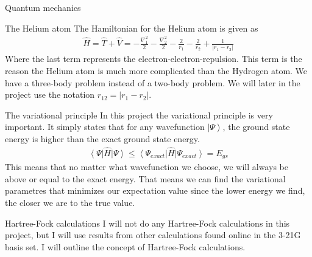 \documentclass[a4paper, 12pt, titlepage]{article}
\begin{document}
\begin{section}{Quantum mechanics}
 \begin{subsection}{The Helium atom}
  The Hamiltonian for the Helium atom is given as
  \begin{align}
  	\hat H = \hat T + \hat V = -\frac{\nabla_1^2}{2} -\frac{\nabla_2^2}{2} - \frac{2}{r_1} - \frac{2}{r_2} + \frac{1}{|r_1 - r_2|}
  \end{align}
  Where the last term represents the electron-electron-repulsion. This term is the reason the Helium atom is much more complicated than the Hydrogen atom. We have a three-body problem instead of a two-body problem. We will later in the project use the notation $r_{12} = |r_1 - r_2|$.
 \end{subsection}

 \begin{subsection}{The variational principle}
 	In this project the variational principle is very important. It simply states that for any wavefunction $\left| \Psi \right>$, the ground state energy is higher than the exact ground state energy. 
 	\begin{align}
 		\left< \Psi \right| \hat H \left| \Psi \right> \leq \left< \Psi_{exact} \right| \hat H \left| \Psi_{exact} \right> = E_{gs}
 	\end{align}
 	This means that no matter what wavefunction we choose, we will always be above or equal to the exact energy. That means we can find the variational parametres that minimizes our expectation value since the lower energy we find, the closer we are to the true value.
 \end{subsection}

 \begin{subsection}{Hartree-Fock calculations}
 	I will not do any Hartree-Fock calculations in this project, but I will use results from other calculations found online in the 3-21G basis set. I will outline the concept of Hartree-Fock calculations. 


\end{subsection}
\end{section}
\end{document}
